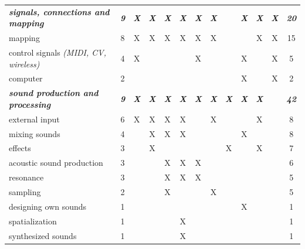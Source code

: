 \documentclass[letterpaper, 12pt]{article}
\begin{document}
\begin{spacing}{1.1}
\begin{supertabular}{L{5.3cm}cccccccccccc}
        \emph{\textbf{signals, connections and mapping}} & \emph{\textbf{9}} & \emph{\textbf{X}} & \emph{\textbf{X}} & \emph{\textbf{X}} & \emph{\textbf{X}} & \emph{\textbf{X}} & \emph{\textbf{X}} & & \emph{\textbf{X}} & \emph{\textbf{X}} & \emph{\textbf{X}} & \emph{\textbf{20}} \\
        mapping                          & 8  & X & X & X & X & X & X &   &   & X & X & 15 \\
        control signals \emph{(MIDI, CV, wireless)} & 4  & X &   &   &   & X &   &   & X &   & X & 5  \\ 
        computer                         & 2  &   &   &   &   &   &   &   & X &   & X & 2  \\
        \hline
        \emph{\textbf{sound production and processing}} & \emph{\textbf{9}} & \emph{\textbf{X}} & \emph{\textbf{X}}    & \emph{\textbf{X}} & \emph{\textbf{X}} & \emph{\textbf{X}} & \emph{\textbf    {X}} & \emph{\textbf{X}} & \emph{\textbf{X}} & \emph{\textbf{X}} & & \emph  {\textbf{42}} \\
        external input                   & 6  & X & X & X & X &   & X &   &   & X &   & 8  \\
        mixing sounds                    & 4  &   & X & X & X &   &   &   & X &   &   & 8  \\
        effects                          & 3  &   & X &   &   &   &   & X &   & X &   & 7  \\
        acoustic sound production        & 3  &   &   & X & X & X &   &   &   &   &   & 6  \\
        resonance                        & 3  &   &   & X & X & X &   &   &   &   &   & 5  \\
        sampling                         & 2  &   &   & X &   &   & X &   &   &   &   & 5  \\
        designing own sounds             & 1  &   &   &   &   &   &   &   & X &   &   & 1  \\
        spatialization                   & 1  &   &   &   & X &   &   &   &   &   &   & 1  \\
        synthesized sounds               & 1  &   &   &   & X &   &   &   &   &   &   & 1  \\
        \hline
        

\end{supertabular}
\end{spacing}
\end{document}
